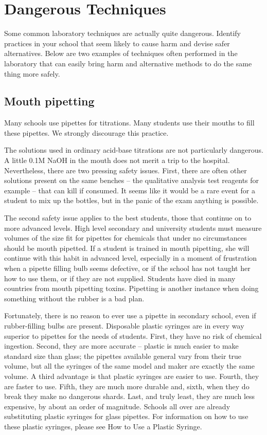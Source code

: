 \chapter{Dangerous Techniques}

Some common laboratory techniques are actually quite dangerous. 
Identify practices in your school 
that seem likely to cause harm and devise safer alternatives. 
Below are two examples of techniques often performed in the laboratory 
that can easily bring harm 
and alternative methods to do the same thing more safely.

\section{Mouth pipetting}

Many schools use pipettes for titrations. 
Many students use their mouths to fill these pipettes. 
We strongly discourage this practice.

The solutions used in ordinary acid-base titrations 
are not particularly dangerous. 
A little 0.1M NaOH in the mouth 
does not merit a trip to the hospital. 
Nevertheless, 
there are two pressing safety issues. 
First, 
there are often other solutions present on the same benches – 
the qualitative analysis test reagents for example – 
that can kill if consumed. 
It seems like it would be a rare event 
for a student to mix up the bottles, 
but in the panic of the exam anything is possible.

The second safety issue applies to the best students, 
those that continue on to more advanced levels. 
High level secondary and university students 
must measure volumes of the size fit for pipettes 
for chemicals that under no circumstances should be mouth pipetted. 
If a student is trained in mouth pipetting, 
she will continue with this habit in advanced level, 
especially in a moment of frustration 
when a pipette filling bulb seems defective, 
or if the school has not taught her how to use them, 
or if they are not supplied. 
Students have died in many countries from mouth pipetting toxins. 
Pipetting is another instance 
when doing something without the rubber is a bad plan.

Fortunately, 
there is no reason to ever use a pipette in secondary school, 
even if rubber-filling bulbs are present. 
Disposable plastic syringes are in every way superior 
to pipettes for the needs of students. 
First, 
they have no risk of chemical ingestion. 
Second, 
they are more accurate – 
plastic is much easier to make standard size than glass; 
the pipettes available general vary from their true volume, 
but all the syringes of the same model 
and maker are exactly the same volume. 
A third advantage is that plastic syringes are easier to use. 
Fourth, 
they are faster to use. 
Fifth, 
they are much more durable and, 
sixth, 
when they do break they make no dangerous shards. 
Last, 
and truly least, 
they are much less expensive, 
by about an order of magnitude. 
Schools all over are already substituting plastic syringes for glass pipettes.
For information on how to use these plastic syringes, 
please see How to Use a Plastic Syringe.

